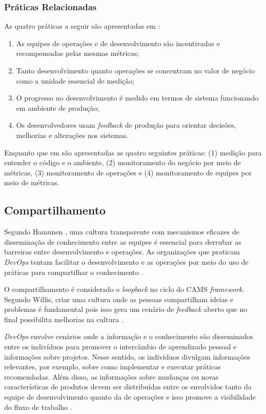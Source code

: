\subsubsection{Práticas Relacionadas}

As quatro práticas a seguir são apresentadas em \cite{extending_dimensions}:

\begin{enumerate}
\item As equipes de operações e de desenvolvimento são incentivadas e
recompensadas pelas mesmas métricas;
\item Tanto desenvolvimento quanto operações se concentram no valor de negócio
como a unidade essencial de medição;
\item O progresso no desenvolvimento é medido em termos de sistema
funcionando em ambiente de produção;
\item Os desenvolvedores usam \textit{feedback} de produção para orientar
decisões, melhorias e alterações nos sistemas.
\end{enumerate}

Enquanto que em \cite{characterizing_devops} são apresentadas as quatro
seguintes práticas: (1) medição para entender o código e o ambiente, (2)
monitoramento do negócio por meio de métricas, (3) monitoramento de operações
e (4) monitoramento de equipes por meio de métricas.

\subsection{Compartilhamento}

Segundo Hamunen \cite{challenges_in_adopting_devops}, uma cultura transparente
com mecanismos eficazes de disseminação de conhecimento entre as equipes é
essencial para derrubar as barreiras entre desenvolvimento e operações.
As organizações que praticam \textit{DevOps} tentam facilitar o desenvolvimento
e as operações por meio do uso de práticas para compartilhar o
conhecimento \cite{qualitative_devops_journalsw_17}.

O compartilhamento é considerado o \textit{loopback} no ciclo do \acrshort{CAMS}
\textit{framework}. Segundo Willis, criar uma cultura onde as pessoas
compartilham ideias e problemas é fundamental pois isso
gera um cenário de \textit{feedback} aberto que no final possibilita melhorias
na cultura \cite{what_devops_means_2010}.

\textit{DevOps} envolve cenários onde a informação e o conhecimento são
disseminados entre os indivíduos para promover o intercâmbio de aprendizado
pessoal e informações sobre projetos. Nesse sentido, os indivíduos divulgam
informações relevantes, por exemplo, sobre como implementar e executar
práticas recomendadas. Além disso, as informações sobre mudanças ou novas
características de produtos devem ser distribuídas entre os envolvidos
tanto da equipe de desenvolvimento quanto da de operações e isso promove a
visibilidade do fluxo de trabalho \cite{characterizing_devops}.

